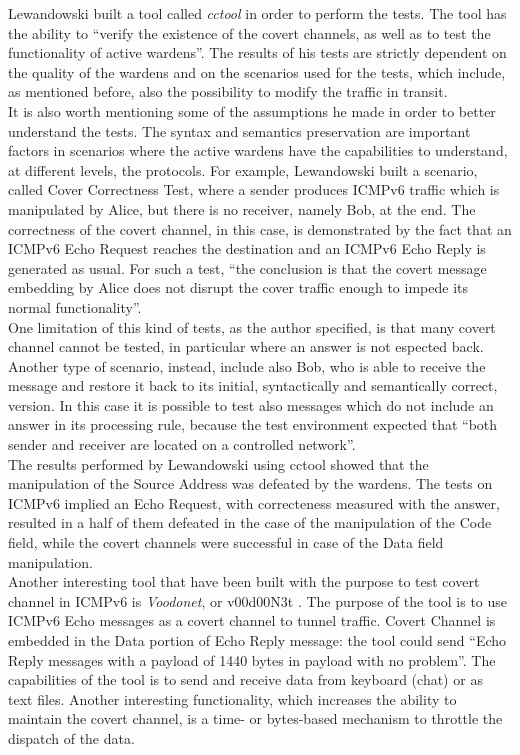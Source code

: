 \documentclass[12pt]{article}
\begin{document}
Lewandowski built a tool called \textit{cctool} in order to perform the tests. The tool has the ability to ``verify the existence of the covert channels, as well as to test the functionality of active wardens''. The results of 
his tests are strictly dependent on the quality of the wardens and on the scenarios used for the tests, which include, as mentioned before, also the possibility to modify the traffic in transit.\\
It is also worth mentioning some of the assumptions he made in order to better understand the tests. The syntax and semantics preservation are important factors in scenarios where the active wardens have the capabilities 
to understand, at different levels, the protocols. For example, Lewandowski built a scenario, called Cover Correctness Test, where a sender produces ICMPv6 traffic which is manipulated by Alice, but there is no receiver, 
namely Bob, at the end. The correctness of the covert channel, in this case, is demonstrated by the fact that an ICMPv6 Echo Request reaches the destination and an ICMPv6 Echo Reply is generated as usual. For such a test, 
``the conclusion is that the covert message embedding by Alice does not disrupt the cover traffic enough to impede its normal functionality''.\\
One limitation of this kind of tests, as the author specified, is that many covert channel cannot be tested, in particular where an answer is not espected back.\\
Another type of scenario, instead, include also Bob, who is able to receive the message and restore it back to its initial, syntactically and semantically correct, version. In this case it is possible to test also messages 
which do not include an answer in its processing rule, because the test environment expected that ``both sender and receiver are located on a controlled network''.\\
The results performed by Lewandowski using cctool showed that the manipulation of the Source Address was defeated by the wardens. The tests on ICMPv6 implied an Echo Request, with correcteness measured with the answer, 
resulted in a half of them defeated in the case of the manipulation of the Code field, while the covert channels were successful in case of the Data field manipulation.\\

Another interesting tool that have been built with the purpose to test covert channel in ICMPv6 is \textit{Voodonet}, or v00d00N3t \cite{voodoo}. The purpose of the tool is to use ICMPv6 Echo messages as a covert channel 
to tunnel traffic. Covert Channel is embedded in the Data portion of Echo Reply message: the tool could send ``Echo Reply messages with a  payload of 1440 bytes in payload with no problem''. The capabilities of the tool 
is to send and receive data from keyboard (chat) or as text files. Another interesting functionality, which increases the ability to maintain the covert channel, is a time- or bytes-based mechanism to throttle the dispatch 
of the data.
\end{document}
